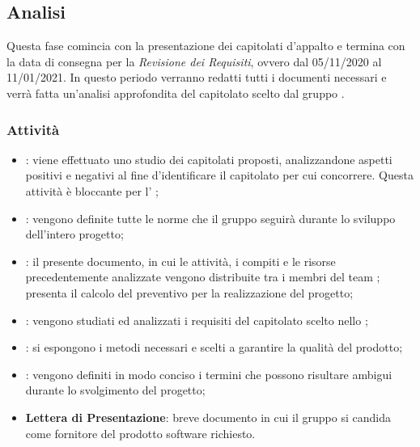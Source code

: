 \subsection{Analisi}
Questa fase comincia con la presentazione dei capitolati d'appalto e termina con la data di consegna per la \textit{Revisione dei Requisiti}, ovvero dal 05/11/2020 al 11/01/2021.
In questo periodo verranno redatti tutti i documenti necessari e verrà fatta un'analisi approfondita del capitolato scelto dal gruppo \Gruppo{}.
\subsubsection{Attività}
\begin{itemize}
\item \textbf{\SdF}: viene effettuato uno studio dei capitolati proposti, analizzandone aspetti positivi e negativi al fine d'identificare il capitolato per cui concorrere. Questa attività è bloccante per l'\textit{\AdR} ;
\item \textbf{\NdP}: vengono definite tutte le norme che il gruppo \Gruppo{} seguirà durante lo sviluppo dell'intero progetto;
\item \textbf{\PdP}: il presente documento, in cui le attività, i compiti\glo{} e le risorse precedentemente analizzate vengono distribuite tra i membri del team \Gruppo{}; presenta il calcolo del preventivo per la realizzazione del progetto;
\item \textbf{\AdR}: vengono studiati ed analizzati i requisiti del capitolato\glo{} scelto nello \textit{\SdF};
\item \textbf{\PdQ}: si espongono i metodi necessari e scelti a garantire la qualità del prodotto;
\item \textbf{\Glossario}: vengono definiti in modo conciso i termini che possono risultare ambigui durante lo svolgimento del progetto;
\item \textbf{Lettera di Presentazione}: breve documento in cui il gruppo \Gruppo{} si candida come fornitore del prodotto software richiesto.
\end{itemize}
